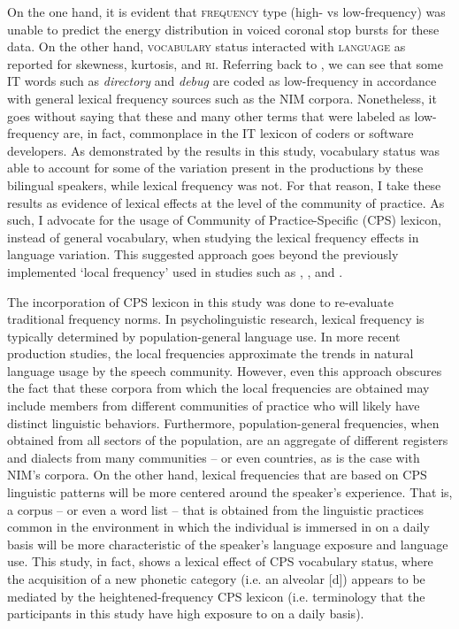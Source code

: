 \documentclass[output=paper,colorlinks,citecolor=brown,
]{langscibook}
\begin{document}
On the one hand, it is evident that \textsc{frequency} type (high- vs low-frequency) was unable to predict the energy distribution in voiced coronal stop bursts for these data. On the other hand, \textsc{vocabulary} status interacted with \textsc{language} as reported for skewness, kurtosis, and \textsc{ri}. Referring back to , we can see that some IT words such as \textit{directory} and \textit{debug} are coded as low-frequency in accordance with general lexical frequency sources such as the NIM corpora. Nonetheless, it goes without saying that these and many other terms that were labeled as low-frequency are, in fact, commonplace in the IT lexicon of coders or software developers. As demonstrated by the results in this study, vocabulary status was able to account for some of the variation present in the productions by these bilingual speakers, while lexical frequency was not. For that reason, I take these results as evidence of lexical effects at the level of the community of practice. As such, I advocate for the usage of Community of Practice-Specific (CPS) lexicon, instead of general vocabulary, when studying the lexical frequency effects in language variation. This suggested approach goes beyond the previously implemented `local frequency' used in studies such as \citet{erker2012role}, \citet{file2011gradient}, and \citet{linford2013lexical}. 

The incorporation of CPS lexicon in this study was done to re-evaluate traditional frequency norms. In psycholinguistic research, lexical frequency is typically determined by population-general language use. In more recent production studies, the local frequencies approximate the trends in natural language usage by the speech community. However, even this approach obscures the fact that these corpora from which the local frequencies are obtained may include members from different communities of practice who will likely have distinct linguistic behaviors. Furthermore, population-general frequencies, when obtained from all sectors of the population, are an aggregate of different registers and dialects from many communities -- or even countries, as is the case with NIM's corpora. On the other hand, lexical frequencies that are based on CPS linguistic patterns will be more centered around the speaker's experience. That is, a corpus -- or even a word list -- that is obtained from the linguistic practices common in the environment in which the individual is immersed in on a daily basis will be more characteristic of the speaker's language exposure and language use. This study, in fact, shows a lexical effect of CPS vocabulary status, where the acquisition of a new phonetic category (i.e. an alveolar [d]) appears to be mediated by the heightened-frequency CPS lexicon (i.e. terminology that the participants in this study have high exposure to on a daily basis).
\end{document}
